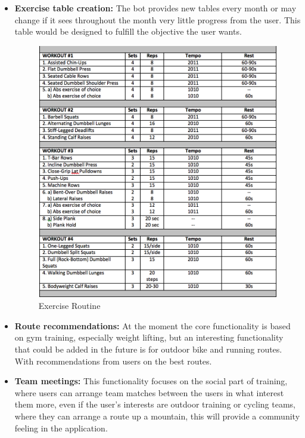 \begin{itemize}
{\begin{center}
\begin{figure}[h!]
				\label{weight_bfr}
			\end{figure}
		\end{center}
	}
	\item{\textbf{Exercise table creation:} The bot provides new tables every month or may change if it sees throughout the month very little progress from the user. This table would be designed to fulfill the objective the user wants.
		\begin{center}
			\begin{figure}[h!]
				\centering
				\includegraphics[scale=0.3]{./images/4-exercise-routine}
				\caption{Exercise Routine}
				\label{4_exercise_routine}
			\end{figure}
		\end{center}
	}
	\item{\textbf{Route recommendations:} At the moment the core functionality is based on gym training, especially weight lifting, but an interesting functionality that could be added in the future is for outdoor bike and running routes. With recommendations from users on the best routes.}
	\item{\textbf{Team meetings:} This functionality focuses on the social part of training, where users can arrange team matches between the users in what interest them more, even if the user’s interests are outdoor training or cycling teams, where they can arrange a route up a mountain, this will provide a community feeling in the application.}
\end{itemize}



